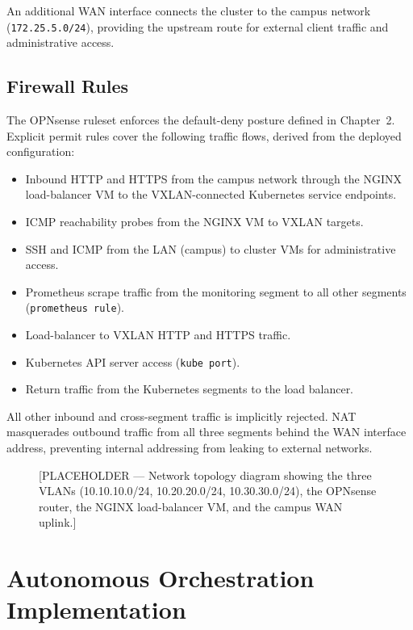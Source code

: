 \documentclass[12pt,a4paper]{report}
\begin{document}
An additional WAN interface connects the cluster to the campus network
(\texttt{172.25.5.0/24}), providing the upstream route for external client traffic
and administrative access.

\subsection{Firewall Rules}

The OPNsense ruleset enforces the default-deny posture defined in Chapter~2.
Explicit permit rules cover the following traffic flows, derived from the deployed
configuration:

\begin{itemize}
  \item Inbound HTTP and HTTPS from the campus network through the NGINX load-balancer VM to the VXLAN-connected Kubernetes service endpoints.
  \item ICMP reachability probes from the NGINX VM to VXLAN targets.
  \item SSH and ICMP from the LAN (campus) to cluster VMs for administrative access.
  \item Prometheus scrape traffic from the monitoring segment to all other segments (\texttt{prometheus rule}).
  \item Load-balancer to VXLAN HTTP and HTTPS traffic.
  \item Kubernetes API server access (\texttt{kube port}).
  \item Return traffic from the Kubernetes segments to the load balancer.
\end{itemize}

All other inbound and cross-segment traffic is implicitly rejected. NAT masquerades
outbound traffic from all three segments behind the WAN interface address, preventing
internal addressing from leaking to external networks.

\begin{figure}[htbp]
\centering
\fbox{\rule{0pt}{5cm}\rule{0.9\linewidth}{0pt}}
\caption{[PLACEHOLDER --- Network topology diagram showing the three VLANs
(10.10.10.0/24, 10.20.20.0/24, 10.30.30.0/24), the OPNsense router, the
NGINX load-balancer VM, and the campus WAN uplink.]}
\label{fig:placeholder_nettopo}
\end{figure}

\section{Autonomous Orchestration Implementation}
\end{document}
